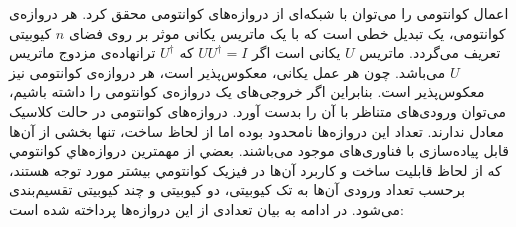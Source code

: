 اعمال کوانتومی را می‌توان با شبکه‌ای از دروازه‌های کوانتومی محقق کرد. هر دروازه‌ی کوانتومی، یک تبدیل خطی است که با یک ماتریس یکانی موثر بر روی فضای $n$ کیوبیتی تعریف می‌گردد. ماتریس $U$ یکانی است اگر $UU^\dag=I$ که $U^\dag$ ترانهاده‌ی مزدوج ماتریس $U$ می‌باشد. چون هر عمل یکانی، معکوس‌پذیر است، هر دروازه‌ی کوانتومی نیز معکوس‌پذیر است. بنابراین اگر خروجی‌های یک دروازه‌ی کوانتومی را داشته باشیم، می‌توان ورودی‌های متناظر با آن را بدست آورد. دروازه‌های کوانتومی در حالت کلاسیک معادل ندارند. تعداد این دروازه‌ها نامحدود بوده اما از لحاظ ساخت، تنها بخشی از آن‌ها قابل پیاده‌سازی با فناوری‌های موجود می‌باشند. بعضي از مهمترين دروازه‌هاي کوانتومي که از لحاظ قابليت ساخت و کاربرد آن‌ها در فيزيک کوانتومي بيشتر مورد توجه هستند، برحسب تعداد ورودی آن‌ها به تک کیوبیتی\cite{bullock2004}، دو کیوبیتی\cite{Barenco95} و چند کیوبیتی تقسیم‌بندی می‌شود. در ادامه به بیان تعدادی از این دروازه‌ها پرداخته شده است:

